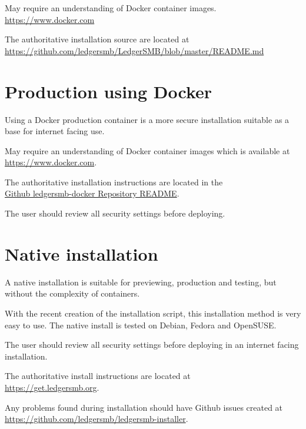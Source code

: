 May require an understanding of Docker container images. \\
\url{https://www.docker.com}

The authoritative installation source are located at \\ 
\url{https://github.com/ledgersmb/LedgerSMB/blob/master/README.md}

\section{Production using Docker}
\label{sec-installation-docker-production}

Using a Docker production container is a more secure installation suitable as a base for internet facing use.

May require an understanding of Docker container images which is available at \\
\url{https://www.docker.com}.

The authoritative installation instructions are located in the\\
\href{https://github.com/ledgersmb/ledgersmb-docker?tab=readme-ov-file#docker-compose-with-reverse-proxy}{Github ledgersmb-docker Repository README}.

The user should review all security settings before deploying.

\section{Native installation}
\label{sec-installation-native}

A native installation is suitable for previewing, production and testing, but without the complexity of containers.

With the recent creation of the installation script, this installation method is very easy to use.
The native install is tested on Debian, Fedora and OpenSUSE. 

The user should review all security settings before deploying in an internet facing installation.

The authoritative install instructions are located at \\
\url{https://get.ledgersmb.org}.

Any problems found during installation should have Github issues created at \\
\url{https://github.com/ledgersmb/ledgersmb-installer}. 

